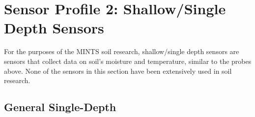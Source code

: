\documentclass{article}
\begin{document}
\section{Sensor Profile 2: Shallow/Single Depth Sensors}
For the purposes of the MINTS soil research, shallow/single depth sensors are sensors that collect data on soil's moisture and temperature, similar to the probes above. None of the sensors in this section have been extensively used in soil research.  %

\subsection{General Single-Depth}
\end{document}
